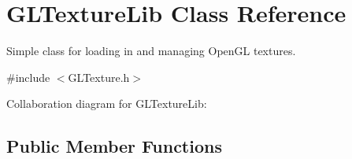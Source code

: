 \hypertarget{class_g_l_texture_lib}{\section{G\-L\-Texture\-Lib Class Reference}
\label{class_g_l_texture_lib}
}


Simple class for loading in and managing Open\-G\-L textures.  




{\ttfamily \#include $<$G\-L\-Texture.\-h$>$}



Collaboration diagram for G\-L\-Texture\-Lib\-:
\subsection*{Public Member Functions}
